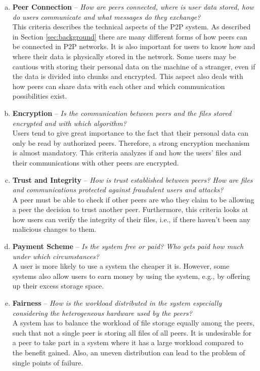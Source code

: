 \begin{enumerate}[(a)]
\item \textbf{Peer Connection} -- \textit{How are peers connected, where is user data stored, how do users communicate and what messages do they exchange?}\\
This criteria describes the technical aspects of the P2P system. As described in Section \ref{sec:background} there are many different forms of how peers can be connected in P2P networks. It is also important for users to know how and where their data is physically stored in the network. Some users may be cautious with storing their personal data on the machine of a stranger, even if the data is divided into chunks and encrypted. This aspect also deals with how peers can share data with each other and which communication possibilities exist. 

\item \textbf{Encryption} -- \textit{Is the communication between peers and the files stored encrypted and with which algorithm?}\\
Users tend to give great importance to the fact that their personal data can only be read by authorized peers. Therefore, a strong encryption mechanism is almost mandatory. This criteria analyzes if and how the users' files and their communications with other peers are encrypted.

\item \textbf{Trust and Integrity} -- \textit{How is trust established between peers? How are files and communications protected against fraudulent users and attacks?}\\
A peer must be able to check if other peers are who they claim to be allowing a peer the decision to trust another peer. Furthermore, this criteria looks at how users can verify the integrity of their files, i.e., if there haven't been any malicious changes to them.

\item \textbf{Payment Scheme} -- \textit{Is the system free or paid? Who gets paid how much under which circumstances?}\\
A user is more likely to use a system the cheaper it is. However, some systems also allow users to earn money by using the system, e.g., by offering up their excess storage space.

\item \textbf{Fairness} -- \textit{How is the workload distributed in the system especially considering the heterogeneous hardware used by the peers?}\\
A system has to balance the workload of file storage equally among the peers, such that not a single peer is storing all files of all peers. It is undesirable for a peer to take part in a system where it has a large workload compared to the benefit gained. Also, an uneven distribution can lead to the problem of single points of failure.


\end{enumerate}
